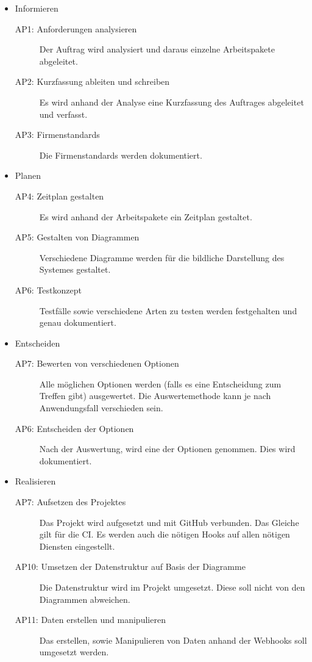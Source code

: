 \begin{itemize}
    \item Informieren
    \begin{description}
        \item[AP1: Anforderungen analysieren] Der Auftrag wird analysiert und daraus einzelne Arbeitspakete abgeleitet. 
        \item[AP2: Kurzfassung ableiten und schreiben] Es wird anhand der Analyse eine Kurzfassung des Auftrages abgeleitet und verfasst.
        \item[AP3: Firmenstandards] Die Firmenstandards werden dokumentiert.
    \end{description}
    \item Planen
    \begin{description}
        \item[AP4: Zeitplan gestalten] Es wird anhand der Arbeitspakete ein Zeitplan gestaltet.
        \item[AP5: Gestalten von Diagrammen] Verschiedene Diagramme werden für die bildliche Darstellung des Systemes gestaltet.
        \item[AP6: Testkonzept] Testfälle sowie verschiedene Arten zu testen werden festgehalten und genau dokumentiert.
    \end{description}
    \item Entscheiden
    \begin{description}
        \item[AP7: Bewerten von verschiedenen Optionen] Alle möglichen Optionen werden (falls es eine Entscheidung zum Treffen gibt) ausgewertet. Die Auswertemethode kann je nach Anwendungsfall verschieden sein.
        \item[AP6: Entscheiden der Optionen] Nach der Auswertung, wird eine der Optionen genommen. Dies wird dokumentiert.
    \end{description}
    \item Realisieren
    \begin{description}
        \item[AP7: Aufsetzen des Projektes] Das Projekt wird aufgesetzt und mit GitHub verbunden. Das Gleiche gilt für die CI. \newline
        Es werden auch die nötigen Hooks auf allen nötigen Diensten eingestellt.
        \item[AP10: Umsetzen der Datenstruktur auf Basis der Diagramme] Die Datenstruktur wird im Projekt umgesetzt. Diese soll nicht von den Diagrammen abweichen.
        \item[AP11: Daten erstellen und manipulieren] Das erstellen, sowie Manipulieren von Daten anhand der Webhooks soll umgesetzt werden.

\end{description}
\end{itemize}
